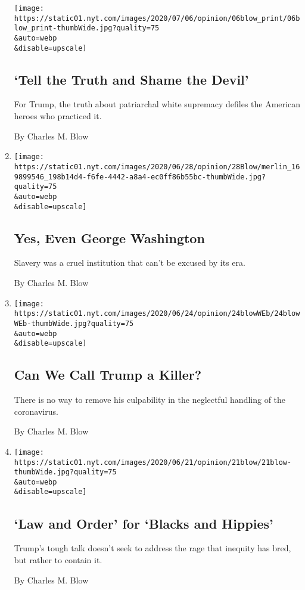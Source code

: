 \begin{enumerate}
  \texttt{[image: https://static01.nyt.com/images/2020/07/06/opinion/06blow\_print/06blow\_print-thumbWide.jpg?quality=75\\\&auto=webp\\\&disable=upscale]}

  \hypertarget{tell-the-truth-and-shame-the-devil}{%
  \subsection{`Tell the Truth and Shame the
  Devil'}\label{tell-the-truth-and-shame-the-devil}}

  For Trump, the truth about patriarchal white supremacy defiles the
  American heroes who practiced it.

  By Charles M. Blow
\item
  \href{/2020/06/28/opinion/george-washington-confederate-statues.html}{}

  \texttt{[image: https://static01.nyt.com/images/2020/06/28/opinion/28Blow/merlin\_169899546\_198b14d4-f6fe-4442-a8a4-ec0ff86b55bc-thumbWide.jpg?quality=75\\\&auto=webp\\\&disable=upscale]}

  \hypertarget{yes-even-george-washington}{%
  \subsection{Yes, Even George
  Washington}\label{yes-even-george-washington}}

  Slavery was a cruel institution that can't be excused by its era.

  By Charles M. Blow
\item
  \href{/2020/06/24/opinion/trump-coronavirus-deaths.html}{}

  \texttt{[image: https://static01.nyt.com/images/2020/06/24/opinion/24blowWEb/24blowWEb-thumbWide.jpg?quality=75\\\&auto=webp\\\&disable=upscale]}

  \hypertarget{can-we-call-trump-a-killer}{%
  \subsection{Can We Call Trump a
  Killer?}\label{can-we-call-trump-a-killer}}

  There is no way to remove his culpability in the neglectful handling
  of the coronavirus.

  By Charles M. Blow
\item
  \href{/2020/06/21/opinion/trump-police-reform.html}{}

  \texttt{[image: https://static01.nyt.com/images/2020/06/21/opinion/21blow/21blow-thumbWide.jpg?quality=75\\\&auto=webp\\\&disable=upscale]}

  \hypertarget{law-and-order-for-blacks-and-hippies}{%
  \subsection{`Law and Order' for `Blacks and
  Hippies'}\label{law-and-order-for-blacks-and-hippies}}

  Trump's tough talk doesn't seek to address the rage that inequity has
  bred, but rather to contain it.

  By Charles M. Blow
\end{enumerate}


